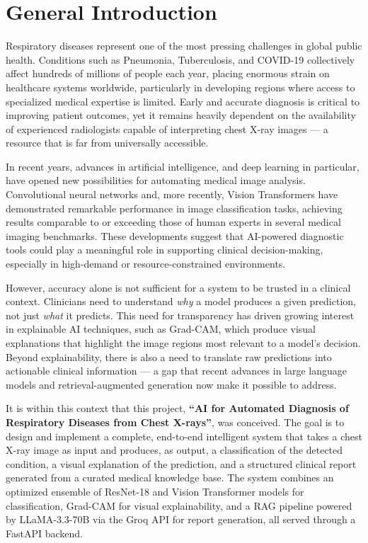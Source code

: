 \documentclass[12pt]{report}
\begin{document}
\mainmatter

\chapter*{General Introduction}
\setcounter{page}{1}

Respiratory diseases represent one of the most pressing challenges in
global public health. Conditions such as Pneumonia, Tuberculosis, and
COVID-19 collectively affect hundreds of millions of people each year,
placing enormous strain on healthcare systems worldwide, particularly in
developing regions where access to specialized medical expertise is
limited. Early and accurate diagnosis is critical to improving patient
outcomes, yet it remains heavily dependent on the availability of
experienced radiologists capable of interpreting chest X-ray images ---
a resource that is far from universally accessible.

In recent years, advances in artificial intelligence, and deep learning
in particular, have opened new possibilities for automating medical image
analysis. Convolutional neural networks and, more recently, Vision
Transformers have demonstrated remarkable performance in image
classification tasks, achieving results comparable to or exceeding those
of human experts in several medical imaging benchmarks. These developments
suggest that AI-powered diagnostic tools could play a meaningful role in
supporting clinical decision-making, especially in high-demand or
resource-constrained environments.

However, accuracy alone is not sufficient for a system to be trusted in
a clinical context. Clinicians need to understand \textit{why} a model
produces a given prediction, not just \textit{what} it predicts. This
need for transparency has driven growing interest in explainable AI
techniques, such as Grad-CAM, which produce visual explanations that
highlight the image regions most relevant to a model's decision. Beyond
explainability, there is also a need to translate raw predictions into
actionable clinical information --- a gap that recent advances in large
language models and retrieval-augmented generation now make it possible
to address.

It is within this context that this project, \textbf{``AI for Automated
Diagnosis of Respiratory Diseases from Chest X-rays''}, was conceived.
The goal is to design and implement a complete, end-to-end intelligent
system that takes a chest X-ray image as input and produces, as output,
a classification of the detected condition, a visual explanation of the
prediction, and a structured clinical report generated from a curated
medical knowledge base. The system combines an optimized ensemble of
ResNet-18 and Vision Transformer models for classification, Grad-CAM for
visual explainability, and a RAG pipeline powered by LLaMA-3.3-70B via
the Groq API for report generation, all served through a FastAPI backend.
\end{document}
